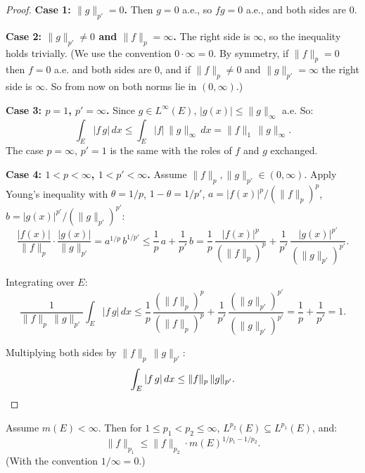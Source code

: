 \documentclass[11pt]{report}
\begin{document}
\begin{proof}\leavevmode

\textbf{Case 1: $\|g\|_{p'} = 0$.} Then $g = 0$ a.e., so $fg = 0$ a.e., and both sides are $0$.

\textbf{Case 2: $\|g\|_{p'} \neq 0$ and $\|f\|_p = \infty$.} The right side is $\infty$, so the inequality holds trivially. (We use the convention $0 \cdot \infty = 0$. By symmetry, if $\|f\|_p = 0$ then $f = 0$ a.e. and both sides are $0$, and if $\|f\|_p \neq 0$ and $\|g\|_{p'} = \infty$ the right side is $\infty$. So from now on both norms lie in $(0, \infty)$.)

\textbf{Case 3: $p = 1$, $p' = \infty$.} Since $g \in L^\infty(E)$, $|g(x)| \leq \|g\|_\infty$ a.e. So:
\[
\int_E |f\,g|\,dx \leq \int_E |f|\,\|g\|_\infty\,dx = \|f\|_1\,\|g\|_\infty.
\]
The case $p = \infty$, $p' = 1$ is the same with the roles of $f$ and $g$ exchanged.

\textbf{Case 4: $1 < p < \infty$, $1 < p' < \infty$.} Assume $\|f\|_p, \|g\|_{p'} \in (0, \infty)$. Apply Young's inequality with $\theta = 1/p$, $1 - \theta = 1/p'$, $a = |f(x)|^p / (\|f\|_p)^p$, $b = |g(x)|^{p'} / (\|g\|_{p'})^{p'}$:
\[
\frac{|f(x)|}{\|f\|_p} \cdot \frac{|g(x)|}{\|g\|_{p'}} = a^{1/p}\,b^{1/p'} \leq \frac{1}{p}\,a + \frac{1}{p'}\,b = \frac{1}{p}\,\frac{|f(x)|^p}{(\|f\|_p)^p} + \frac{1}{p'}\,\frac{|g(x)|^{p'}}{(\|g\|_{p'})^{p'}}.
\]

Integrating over $E$:
\[
\frac{1}{\|f\|_p\,\|g\|_{p'}} \int_E |f\,g|\,dx \leq \frac{1}{p}\,\frac{(\|f\|_p)^p}{(\|f\|_p)^p} + \frac{1}{p'}\,\frac{(\|g\|_{p'})^{p'}}{(\|g\|_{p'})^{p'}} = \frac{1}{p} + \frac{1}{p'} = 1.
\]

Multiplying both sides by $\|f\|_p\,\|g\|_{p'}$:
\[
\int_E |f\,g|\,dx \leq \|f\|_p\,\|g\|_{p'}. \qedhere
\]
\end{proof}

\begin{corbox}
Assume $m(E) < \infty$. Then for $1 \leq p_1 < p_2 \leq \infty$, $L^{p_2}(E) \subseteq L^{p_1}(E)$, and:
\[
\|f\|_{p_1} \leq \|f\|_{p_2} \cdot m(E)^{1/p_1 - 1/p_2}.
\]
(With the convention $1/\infty = 0$.)
\end{corbox}
\end{document}
